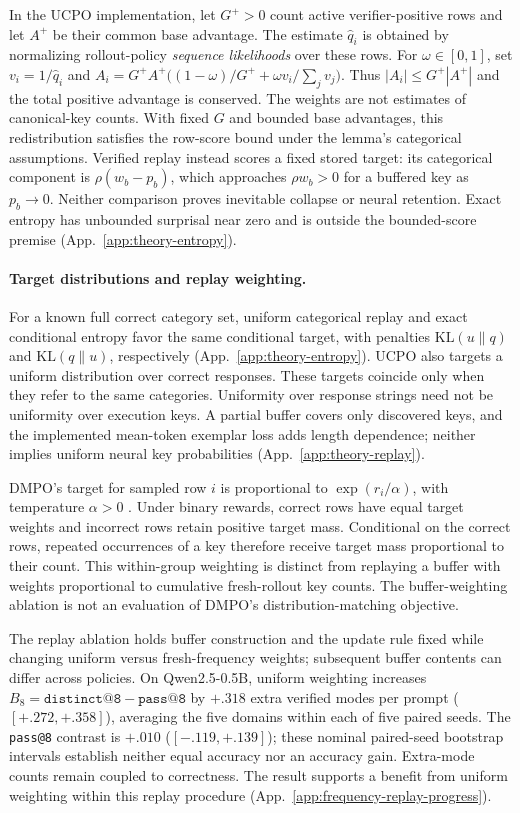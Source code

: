 In the UCPO implementation, let $G^+>0$ count active verifier-positive rows
and let $A^+$ be their common base advantage. The estimate $\hat q_i$ is
obtained by normalizing rollout-policy \emph{sequence likelihoods} over
these rows. For $\omega\in[0,1]$, set $v_i=1/\hat q_i$ and
$A_i=G^+A^+\bigl((1-\omega)/G^++\omega v_i/\sum_jv_j\bigr)$.
Thus $|A_i|\le G^+|A^+|$ and the total positive advantage is conserved.
The weights are not estimates of canonical-key counts. With fixed $G$ and
bounded base advantages, this redistribution satisfies the row-score bound
under the lemma's categorical assumptions. Verified replay instead scores
a fixed stored target: its categorical component is $\rho(w_b-p_b)$,
which approaches $\rho w_b>0$ for a buffered key as $p_b\to0$.
Neither comparison proves inevitable collapse or neural retention.
Exact entropy has unbounded surprisal near zero and is outside the bounded-score
premise (App.~\ref{app:theory-entropy}).

\paragraph{Target distributions and replay weighting.}
For a known full correct category set, uniform categorical replay and exact
conditional entropy favor the same conditional target, with penalties
$\mathrm{KL}(u\|q)$ and $\mathrm{KL}(q\|u)$, respectively
(App.~\ref{app:theory-entropy}). UCPO also targets a uniform distribution
over correct responses. These targets coincide only when they refer to the
same categories. Uniformity over response strings need not be uniformity
over execution keys. A partial buffer covers only discovered keys, and the
implemented mean-token exemplar loss adds length dependence; neither implies
uniform neural key probabilities (App.~\ref{app:theory-replay}).

DMPO's target for sampled row $i$ is proportional to
$\exp(r_i/\alpha)$, with temperature $\alpha>0$
\citep[Eq.~5]{li2026distribution}. Under binary rewards, correct rows have
equal target weights and incorrect rows retain positive target mass.
Conditional on the correct rows, repeated occurrences of a key therefore
receive target mass proportional to their count. This within-group
weighting is distinct from replaying a buffer with weights proportional to
cumulative fresh-rollout key counts. The buffer-weighting ablation is not an
evaluation of DMPO's distribution-matching objective.

The replay ablation holds buffer construction and the update rule fixed while
changing uniform versus fresh-frequency weights; subsequent buffer contents
can differ across policies. On Qwen2.5-0.5B, uniform weighting increases
$B_8=\texttt{distinct@8}-\texttt{pass@8}$ by $+.318$ extra verified modes
per prompt ($[+.272,+.358]$), averaging the five domains within each of five
paired seeds. The \texttt{pass@8} contrast is $+.010$ ($[-.119,+.139]$);
these nominal paired-seed bootstrap intervals establish neither equal
accuracy nor an accuracy gain. Extra-mode counts remain coupled to
correctness. The result supports a benefit from uniform weighting within
this replay procedure (App.~\ref{app:frequency-replay-progress}).

